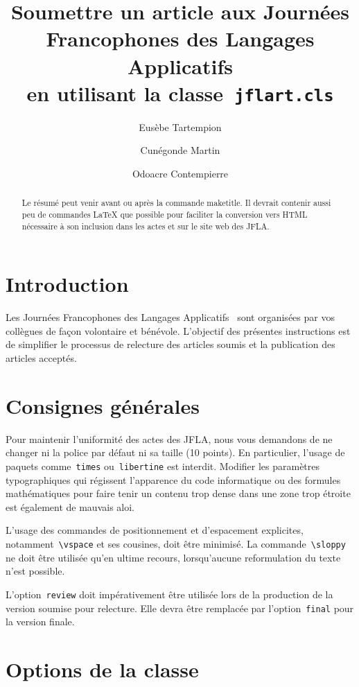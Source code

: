 \documentclass{jflart}
\title{Soumettre un article aux Journées Francophones des Langages Applicatifs\\
  en utilisant la classe~\texttt{jflart.cls}}
\author[1]{Eusèbe Tartempion}
\author[2]{Cunégonde Martin}
\author[2]{Odoacre Contempierre}
\affil[1]{Université Paris Université, CNRS, INRIA, CEA, INRA, INSERM, Paris, 75013, France}
\affil[2]{Université Sorbonne Très Grand Sud, Nice, 06000, France}
\newcommand{\cmd}[1]{\texttt{\textbackslash {#1}}}
\begin{document}
\maketitle

\begin{abstract}
  Le résumé peut venir avant ou après la commande maketitle.
  Il devrait contenir aussi peu de commandes LaTeX que possible pour faciliter
  la conversion vers HTML nécessaire à son inclusion dans les actes et sur le
  site web des JFLA.
\end{abstract}

\section{Introduction}

Les Journées Francophones des Langages Applicatifs~\cite{JFLA} sont organisées
par vos collègues de façon volontaire et bénévole.
%
L'objectif des présentes instructions est de simplifier le processus de
relecture des articles soumis et la publication des articles acceptés.

\section{Consignes générales}

Pour maintenir l'uniformité des actes des JFLA, nous vous demandons de ne
changer ni la police par défaut ni sa taille (10 points).
%
En particulier, l'usage de paquets comme~\texttt{times} ou~\texttt{libertine}
est interdit.
%
Modifier les paramètres typographiques qui régissent l'apparence du code
informatique ou des formules mathématiques pour faire tenir un contenu trop
dense dans une zone trop étroite est également de mauvais aloi.

L'usage des commandes de positionnement et d'espacement explicites,
notamment~\cmd{vspace} et ses cousines, doit être minimisé.
%
La commande~\cmd{sloppy} ne doit être utilisée qu'en ultime recours,
lorsqu'aucune reformulation du texte n'est possible.

L'option~\texttt{review} doit impérativement être utilisée lors de la production
de la version soumise pour relecture.
%
Elle devra être remplacée par l'option~\texttt{final} pour la version finale.

\section{Options de la classe}
\end{document}

